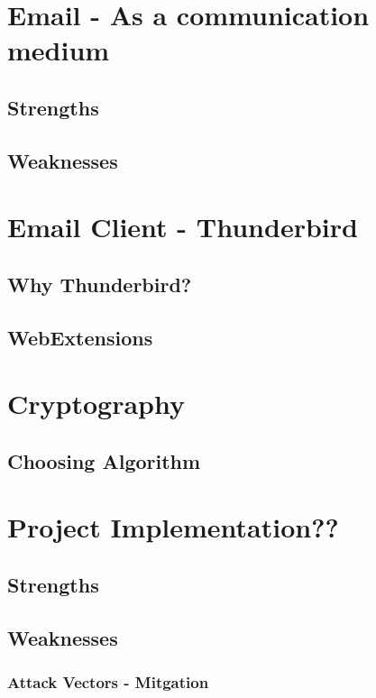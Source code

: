 \documentclass[12pt,a4paper]{article}
\begin{document}


\tableofcontents
\newpage




\section{Email - As a communication medium}
\subsection{Strengths}
\subsection{Weaknesses}

\section{Email Client - Thunderbird}
\subsection{Why Thunderbird?}
\subsection{WebExtensions}

\section{Cryptography}
\subsection{Choosing Algorithm}

\section{Project Implementation??}
\subsection{Strengths}
\subsection{Weaknesses}
\subsubsection{Attack Vectors - Mitgation}
\end{document}
